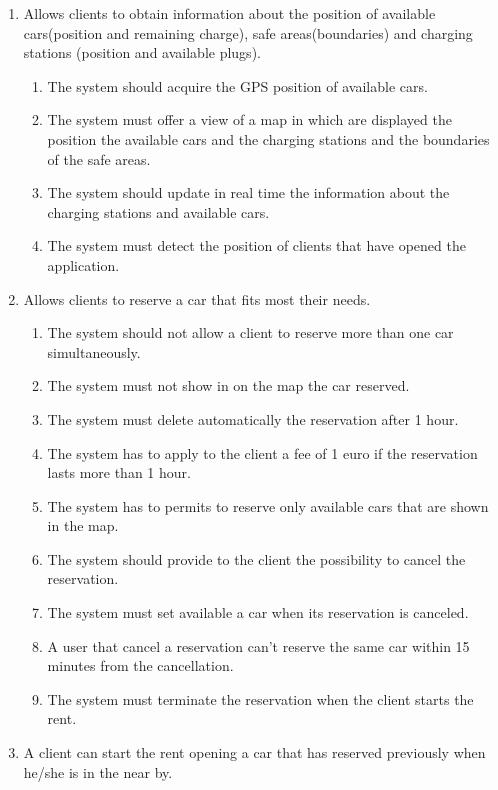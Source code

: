 \begin{enumerate}
\item Allows clients to obtain information about
the position of available cars(position and remaining charge), safe areas(boundaries) and charging stations (position and available plugs).
\begin{enumerate}
\item The system should acquire the GPS position of available cars.
\item The system must offer a view of a map in which are displayed the position the available cars and the charging stations and the boundaries of the safe areas.
\item The system should update in real time the information about the charging stations and available cars.
\item The system must detect the position of clients that have opened the application.
\end{enumerate}


\item Allows clients to reserve a car that fits most their needs.
\begin{enumerate}
\item  The system should not allow a client to reserve more than one car simultaneously.
\item The system must not show in on the map the car reserved. 
\item The system must delete automatically the reservation after 1 hour.
\item The system has to apply to the client a fee of 1 euro if the reservation lasts more than 1 hour.
\item The system has to permits to reserve only available cars that are shown in the map.
\item The system should provide to the client the possibility to cancel the reservation.
\item The system must set available a car when its reservation is canceled.
\item A user that cancel a reservation can't reserve the same car within 15 minutes from the cancellation.
\item The system must terminate the reservation when the client starts the rent.
\end{enumerate}


\item A client can start the rent opening a car that has reserved previously when he/she is in the near by.


\end{enumerate}
